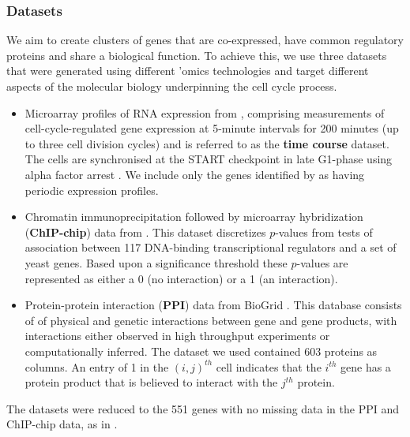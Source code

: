 \documentclass{article}
\begin{document}
\subsubsection{Datasets}
We aim to create clusters of genes that are co-expressed, have common regulatory proteins and share a biological function. To achieve this, we use three datasets that were generated using different 'omics technologies and target different aspects of the molecular biology underpinning the cell cycle process.
\begin{itemize}
	\item Microarray profiles of RNA expression from \cite{granovskaia2010high}, comprising measurements of cell-cycle-regulated gene expression at 5-minute intervals for 200 minutes (up to three cell division cycles) and is referred to as the \textbf{time course} dataset. The cells are synchronised at the START checkpoint in late G1-phase using alpha factor arrest
	\citep{granovskaia2010high}. We include only the genes identified by \cite{granovskaia2010high} as having periodic expression profiles.
	\item Chromatin immunoprecipitation followed by microarray hybridization (\textbf{ChIP-chip}) data from \cite{harbison2004transcriptional}. This dataset discretizes $p$-values from tests of association between 117 DNA-binding transcriptional regulators and a set of yeast genes. Based upon a significance threshold these $p$-values are represented as either a 0 (no interaction) or a 1 (an interaction).
	\item Protein-protein interaction (\textbf{PPI}) data from BioGrid \citep{stark2006biogrid}. This database consists of of physical and genetic interactions between gene and gene products, with interactions either observed in high throughput experiments or computationally inferred. The dataset we used contained 603 proteins as columns. An entry of 1 in the $(i, j)^{th}$ cell indicates that the $i^{th}$ gene has a protein product that is believed to interact with the $j^{th}$ protein.
\end{itemize}
The datasets were reduced to the 551 genes with no missing data in the PPI and ChIP-chip data, as in \cite{kirk2012bayesian}. 
\end{document}
